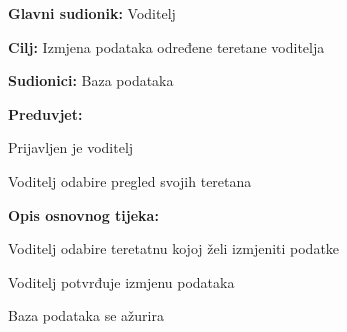 				\noindent {}
				\begin{packed_item}
					
					\item \textbf{Glavni sudionik: } Voditelj
					\item  \textbf{Cilj:} Izmjena podataka određene teretane voditelja
					\item  \textbf{Sudionici:} Baza podataka
					\item  \textbf{Preduvjet:}
					\item[] \begin{packed_enum}
						
						\item Prijavljen je voditelj 
						\item Voditelj odabire pregled svojih teretana
						
					\end{packed_enum}
					\item  \textbf{Opis osnovnog tijeka:}
					
					\item[] \begin{packed_enum}
						
						\item Voditelj odabire teretatnu kojoj želi izmjeniti podatke
						\item Voditelj potvrđuje izmjenu podataka
						\item Baza podataka se ažurira
					\end{packed_enum}
					
					
				\end{packed_item}
				
